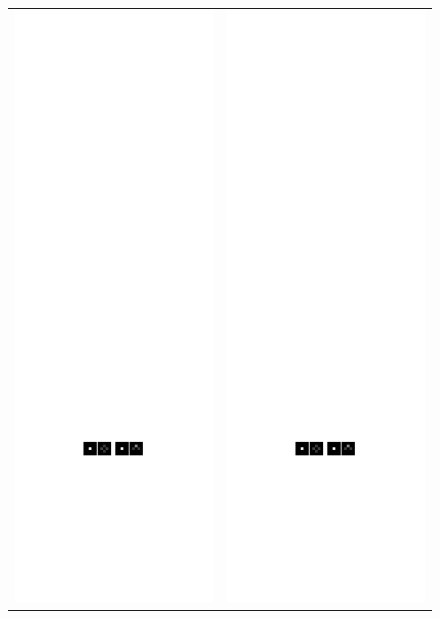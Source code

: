 \documentclass[letterpaper]{article} %
\begin{document}
\begin{figure}
\centering
\begin{tabular}{cc}
\includegraphics[width=0.4\columnwidth]{deter-2-1}
& 
\includegraphics[width=0.4\columnwidth]{deter-2-2}

\end{tabular}
\end{figure}
\end{document}
